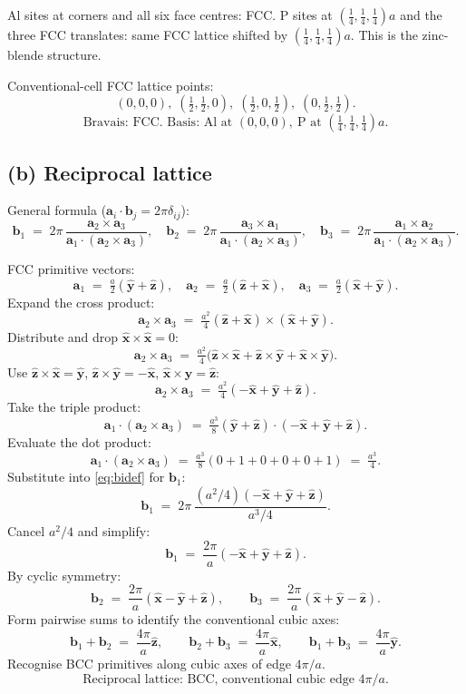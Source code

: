 \documentclass[11pt]{article}
\begin{document}
Al sites at corners and all six face centres: FCC. P sites at $(\tfrac14,\tfrac14,\tfrac14)a$ and the three FCC translates: same FCC lattice shifted by $(\tfrac14,\tfrac14,\tfrac14)a$. This is the zinc-blende structure.

Conventional-cell FCC lattice points:
\[
(0,0,0),\;(\tfrac12,\tfrac12,0),\;(\tfrac12,0,\tfrac12),\;(0,\tfrac12,\tfrac12).
\]
\begin{equation}
\boxed{\;\text{Bravais: FCC. Basis: Al at }(0,0,0),\ \text{P at }(\tfrac14,\tfrac14,\tfrac14)a.\;}
\label{eq:basis}
\end{equation}

\subsection*{(b) Reciprocal lattice}

General formula ($\bm a_i\cdot\bm b_j=2\pi\delta_{ij}$):
\begin{equation}
\bm b_1 \;=\; 2\pi\,\frac{\bm a_2\times\bm a_3}{\bm a_1\cdot(\bm a_2\times\bm a_3)},\quad
\bm b_2 \;=\; 2\pi\,\frac{\bm a_3\times\bm a_1}{\bm a_1\cdot(\bm a_2\times\bm a_3)},\quad
\bm b_3 \;=\; 2\pi\,\frac{\bm a_1\times\bm a_2}{\bm a_1\cdot(\bm a_2\times\bm a_3)}.
\label{eq:bidef}
\end{equation}

FCC primitive vectors:
\[
\bm a_1 \;=\; \tfrac{a}{2}(\hat{\bm y}+\hat{\bm z}),\quad
\bm a_2 \;=\; \tfrac{a}{2}(\hat{\bm z}+\hat{\bm x}),\quad
\bm a_3 \;=\; \tfrac{a}{2}(\hat{\bm x}+\hat{\bm y}).
\]
Expand the cross product:
\[
\bm a_2\times\bm a_3 \;=\; \tfrac{a^2}{4}(\hat{\bm z}+\hat{\bm x})\times(\hat{\bm x}+\hat{\bm y}).
\]
Distribute and drop $\hat{\bm x}\!\times\!\hat{\bm x}=0$:
\[
\bm a_2\times\bm a_3 \;=\; \tfrac{a^2}{4}\bigl(\hat{\bm z}\!\times\!\hat{\bm x}+\hat{\bm z}\!\times\!\hat{\bm y}+\hat{\bm x}\!\times\!\hat{\bm y}\bigr).
\]
Use $\hat{\bm z}\!\times\!\hat{\bm x}=\hat{\bm y}$, $\hat{\bm z}\!\times\!\hat{\bm y}=-\hat{\bm x}$, $\hat{\bm x}\!\times\!\hat{\bm y}=\hat{\bm z}$:
\[
\bm a_2\times\bm a_3 \;=\; \tfrac{a^2}{4}(-\hat{\bm x}+\hat{\bm y}+\hat{\bm z}).
\]
Take the triple product:
\[
\bm a_1\cdot(\bm a_2\times\bm a_3) \;=\; \tfrac{a^3}{8}(\hat{\bm y}+\hat{\bm z})\cdot(-\hat{\bm x}+\hat{\bm y}+\hat{\bm z}).
\]
Evaluate the dot product:
\[
\bm a_1\cdot(\bm a_2\times\bm a_3) \;=\; \tfrac{a^3}{8}(0+1+0+0+0+1) \;=\; \tfrac{a^3}{4}.
\]
Substitute into \eqref{eq:bidef} for $\bm b_1$:
\[
\bm b_1 \;=\; 2\pi\,\frac{(a^2/4)(-\hat{\bm x}+\hat{\bm y}+\hat{\bm z})}{a^3/4}.
\]
Cancel $a^2/4$ and simplify:
\[
\bm b_1 \;=\; \frac{2\pi}{a}(-\hat{\bm x}+\hat{\bm y}+\hat{\bm z}).
\]
By cyclic symmetry:
\[
\bm b_2 \;=\; \frac{2\pi}{a}(\hat{\bm x}-\hat{\bm y}+\hat{\bm z}),\qquad
\bm b_3 \;=\; \frac{2\pi}{a}(\hat{\bm x}+\hat{\bm y}-\hat{\bm z}).
\]
Form pairwise sums to identify the conventional cubic axes:
\[
\bm b_1+\bm b_2 \;=\; \frac{4\pi}{a}\hat{\bm z},\qquad \bm b_2+\bm b_3 \;=\; \frac{4\pi}{a}\hat{\bm x},\qquad \bm b_1+\bm b_3 \;=\; \frac{4\pi}{a}\hat{\bm y}.
\]
Recognise BCC primitives along cubic axes of edge $4\pi/a$.
\begin{equation}
\boxed{\;\text{Reciprocal lattice: BCC, conventional cubic edge }4\pi/a.\;}
\label{eq:reclat}
\end{equation}
\end{document}
